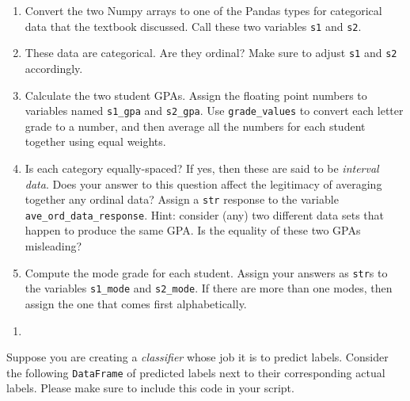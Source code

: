 \documentclass[
  12pt,
  krantz2]{krantz}
\providecommand{\tightlist}{%
  \setlength{\itemsep}{0pt}\setlength{\parskip}{0pt}}
\begin{document}
\begin{enumerate}
\def\labelenumi{\alph{enumi})}
\tightlist
\item
  Convert the two Numpy arrays to one of the Pandas types for categorical data that the textbook discussed. Call these two variables \texttt{s1} and \texttt{s2}.
\item
  These data are categorical. Are they ordinal? Make sure to adjust \texttt{s1} and \texttt{s2} accordingly.
\item
  Calculate the two student GPAs. Assign the floating point numbers to variables named \texttt{s1\_gpa} and \texttt{s2\_gpa}. Use \texttt{grade\_values} to convert each letter grade to a number, and then average all the numbers for each student together using equal weights.
\item
  Is each category equally-spaced? If yes, then these are said to be \emph{interval data}. Does your answer to this question affect the legitimacy of averaging together any ordinal data? Assign a \texttt{str} response to the variable \texttt{ave\_ord\_data\_response}. Hint: consider (any) two different data sets that happen to produce the same GPA. Is the equality of these two GPAs misleading?
\item
  Compute the mode grade for each student. Assign your answers as \texttt{str}s to the variables \texttt{s1\_mode} and \texttt{s2\_mode}. If there are more than one modes, then assign the one that comes first alphabetically.
\end{enumerate}

\begin{enumerate}
\def\labelenumi{\arabic{enumi}.}
\setcounter{enumi}{1}
\tightlist
\item
\end{enumerate}

Suppose you are creating a \emph{classifier} whose job it is to predict labels. Consider the following \texttt{DataFrame} of predicted labels next to their corresponding actual labels. Please make sure to include this code in your script.
\end{document}
